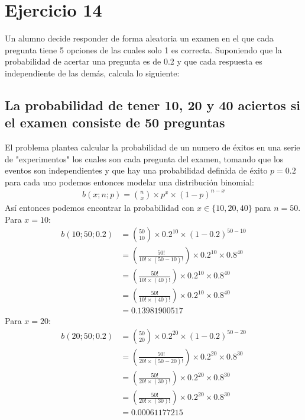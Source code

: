\documentclass[12pt]{article}
\begin{document}
\section{Ejercicio 14}
 Un alumno decide responder de forma aleatoria un examen en el que cada pregunta tiene
5 opciones de las cuales solo 1 es correcta. Suponiendo que la probabilidad de acertar una
pregunta es de 0.2 y que cada respuesta es independiente de las demás, calcula lo siguiente:\\
\subsection{La probabilidad de tener 10, 20 y 40 aciertos si el examen consiste de 50 preguntas}
El problema plantea calcular la probabilidad de un numero de éxitos en una serie de "experimentos" los cuales son cada pregunta del examen, tomando que los eventos son independientes y que hay una probabilidad definida de éxito $p=0.2$ para cada uno podemos entonces modelar una distribución binomial:
\begin{equation}
\begin{split}
b(x;n;p)={n\choose x} \times p^x \times (1 - p)^{n-x}
\end{split} 
\end{equation}
Así entonces podemos encontrar la probabilidad con $x \in \{10, 20, 40\}$ para $n=50$.\\
Para $x=10$:\\
\begin{equation}
\begin{split}
b(10;50;0.2)&={50\choose 10} \times 0.2^{10} \times (1 - 0.2)^{50-10}\\
&=(\frac{50!}{10!\times(50-10)!}) \times 0.2^{10} \times 0.8^{40}\\
&=(\frac{50!}{10!\times(40)!}) \times 0.2^{10} \times 0.8^{40}\\
&=(\frac{50!}{10!\times(40)!}) \times 0.2^{10} \times 0.8^{40}\\
&= 0.13981900517
\end{split} 
\end{equation}
Para $x=20$:\\
\begin{equation}
\begin{split}
b(20;50;0.2)&={50\choose 20} \times 0.2^{20} \times (1 - 0.2)^{50-20}\\
&=(\frac{50!}{20!\times(50-20)!}) \times 0.2^{20} \times 0.8^{30}\\
&=(\frac{50!}{20!\times(30)!}) \times 0.2^{20} \times 0.8^{30}\\
&=(\frac{50!}{20!\times(30)!}) \times 0.2^{20} \times 0.8^{30}\\
&= 0.00061177215
\end{split} 
\end{equation}
\end{document}
